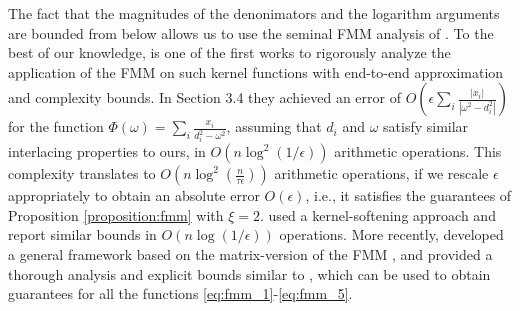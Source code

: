 \documentclass{article}
\newcommand{\lpar}{\left(}
\newcommand{\rpar}{\right)}
\begin{document}
The fact that the magnitudes of the denonimators and the logarithm arguments are bounded from below allows us to use the seminal FMM analysis of \cite{gu1993stable,livne2002n,cai2020stable}. 
To the best of our knowledge, \cite{gu1993stable} is one of the first works to rigorously analyze the application of the FMM on such kernel functions with end-to-end approximation and complexity bounds. In Section 3.4 they achieved an error of $O\lpar
\epsilon \sum_i\tfrac{|x_i|}{|\omega^2-d_i^2|}
\rpar$
for the function $\Phi(\omega)=\sum_i\frac{x_i}{d_i^2-\omega^2}$, assuming that $d_i$ and $\omega$ satisfy similar interlacing properties to ours,
in $O(n\log^2(1/\epsilon))$ arithmetic operations. This complexity translates to $O(n\log^2(\tfrac{n}{\tau\epsilon}))$ arithmetic operations, if we rescale $\epsilon$ appropriately to obtain an absolute error $O(\epsilon)$, i.e., it satisfies the guarantees of Proposition \ref{proposition:fmm} with $\xi=2$. \cite{livne2002n} used a kernel-softening approach and report similar bounds in $O(n\log(1/\epsilon))$ operations. More recently, \cite{cai2020stable} developed a general framework based on the matrix-version of the FMM \cite{sun2001matrix}, and provided a thorough analysis and explicit bounds similar to \cite{gu1993stable}, which can be used to obtain guarantees for all the functions \eqref{eq:fmm_1}-\eqref{eq:fmm_5}. 
\end{document}
